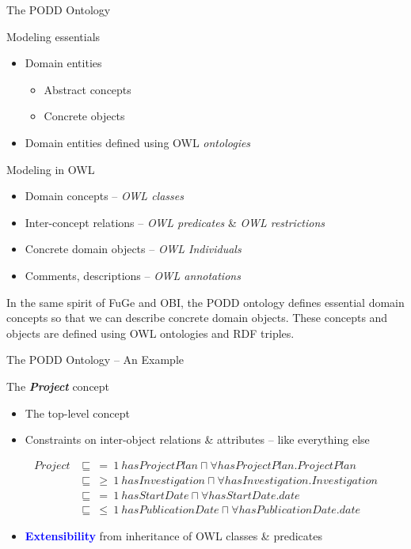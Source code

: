 \documentclass[ignorenonframetext,compress]{beamer}
\begin{document}
\begin{frame}{The PODD Ontology}
\begin{block}{Modeling essentials}
    \begin{itemize}
    \item Domain entities
        \begin{itemize}
        \item Abstract concepts
        \item Concrete objects
        \end{itemize}
    \item Domain entities defined using OWL \emph{ontologies}
    \end{itemize}
\end{block}
\pause
\begin{block}{Modeling in OWL}
    \begin{itemize}
    \item Domain concepts -- \emph{OWL classes}
    \item Inter-concept relations -- \emph{OWL predicates} \& \emph{OWL restrictions}
    \item Concrete domain objects -- \emph{OWL Individuals}
    \item Comments, descriptions -- \emph{OWL annotations}
    \end{itemize}
\end{block}
\end{frame}

In the same spirit of FuGe and OBI, the PODD ontology defines 
essential domain concepts so that we can describe concrete domain
objects. These concepts and objects are defined using OWL ontologies
and RDF triples.

\begin{frame}{The PODD Ontology -- An Example}
\begin{example}{The \textbf{\emph{Project}} concept}
    \begin{itemize}
    \item The top-level concept
    \item Constraints on inter-object relations \& attributes -- like everything else
    \end{itemize}
    \pause
    {\small
    \begin{align*}
    Project &\sqsubseteq~ =~ 1~ hasProjectPlan \sqcap \forall hasProjectPlan.ProjectPlan\\
            &\sqsubseteq~ \geq~ 1~ hasInvestigation \sqcap \forall hasInvestigation.Investigation\\
            &\sqsubseteq~ =~ 1~ hasStartDate \sqcap \forall hasStartDate.date\\
            &\sqsubseteq~ \leq~ 1~ hasPublicationDate \sqcap \forall hasPublicationDate.date
    \end{align*}}
\end{example}
\begin{block}{}
    \begin{itemize}
    \item \textcolor{blue}{\textbf{Extensibility}} from inheritance of OWL classes \& predicates
    \end{itemize}
\end{block}
\end{frame}
\end{document}
